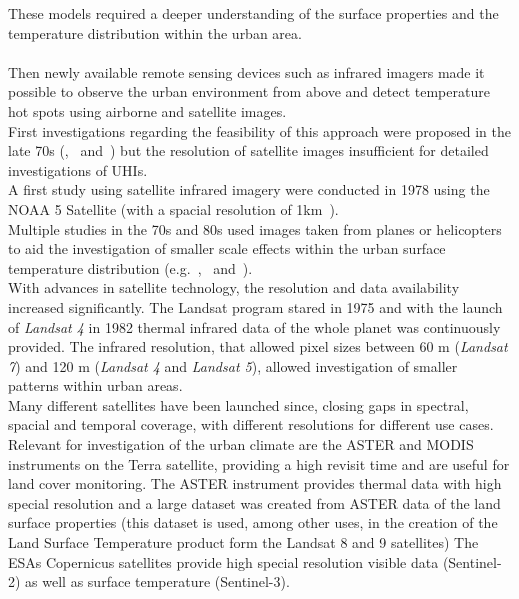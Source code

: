 \documentclass[12pt,a4paper, english,twoside]{article}
\begin{document}
  These models required a deeper understanding of the surface properties and the temperature distribution within the urban area.\\ \\
  Then newly available remote sensing devices such as infrared imagers made it possible to observe the urban environment from above and detect temperature hot spots using airborne and satellite images.  \\
  First investigations regarding the feasibility of this approach were proposed in the late 70s (\cite{Watson1975},~\cite{Carlson1977} and~\cite{Block1978}) but the resolution of satellite images insufficient for detailed investigations of \glspl{UHI}.\\
  A first study using satellite infrared imagery were conducted in 1978 using the NOAA 5 Satellite (with a spacial resolution of 1km~\autocite{Matson1978}).\\
  Multiple studies in the 70s and 80s used images taken from planes or helicopters to aid the investigation of smaller scale effects within the urban surface temperature distribution (e.g.~\cite{Landsberg1979},~\cite{ljungberg1980use} and~\cite{Foster1981}). \\
  With advances in satellite technology, the resolution and data availability increased significantly. 
  The Landsat program stared in 1975 and with the launch of \textit{Landsat 4} in 1982 thermal infrared data of the whole planet was continuously provided. 
  The infrared resolution, that allowed pixel sizes between 60 m (\textit{Landsat 7}) and 120 m (\textit{Landsat 4} and \textit{Landsat 5}), allowed investigation of smaller patterns within urban areas.\\
  Many different satellites have been launched since, closing gaps in spectral, spacial and temporal coverage, with different resolutions for different use cases. 
  Relevant for investigation of the urban climate are the ASTER and MODIS instruments on the Terra satellite, providing a high revisit time and are useful for land cover monitoring. 
  The ASTER instrument provides thermal data with high special resolution and a large dataset was created from ASTER data of the land surface properties (this dataset is used, among other uses, in the creation of the Land Surface Temperature product form the Landsat 8 and 9 satellites)
  The \glspl{ESA} Copernicus satellites provide high special resolution visible data (Sentinel-2) as well as surface temperature (Sentinel-3). \\
\end{document}
